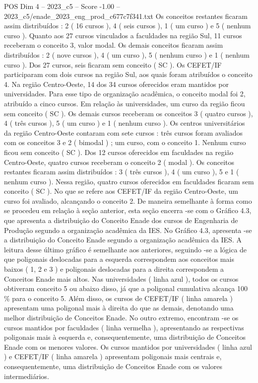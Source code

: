 \begin{textsample}{POS Dim 4 – 2023\_c5 – Score -1.00 – 2023\_c5/enade\_2023\_eng\_prod\_c677c7f341.txt}
Os conceitos restantes ficaram assim distribuídos : 2 ( 16 cursos ), 4 ( seis cursos ), 1 ( um curso ) e 5 ( nenhum curso ).
Quanto aos 27 cursos vinculados a faculdades na região Sul, 11 cursos receberam o conceito 3, valor modal.
Os demais conceitos ficaram assim distribuídos : 2 ( nove cursos ), 4 ( um curso ), 5 ( nenhum curso ) e 1 ( nenhum curso ).
Dos 27 cursos, seis ficaram sem conceito ( SC ).
Os CEFET/IF participaram com dois cursos na região Sul, aos quais foram atribuídos o conceito 4.
Na região Centro-Oeste, 14 dos 34 cursos oferecidos eram mantidos por universidades.
Para esse tipo de organização acadêmica, o conceito modal foi 2, atribuído a cinco cursos.
Em relação às universidades, um curso da região ficou sem conceito ( SC ).
Os demais cursos receberam os conceitos 3 ( quatro cursos ), 4 ( três cursos ), 5 ( um curso ) e 1 ( nenhum curso ).
Os centros universitários da região Centro-Oeste contaram com sete cursos : três cursos foram avaliados com os conceitos 3 e 2 ( bimodal ) ; um curso, com o conceito 1.
Nenhum curso ficou sem conceito ( SC ).
Dos 12 cursos oferecidos em faculdades na região Centro-Oeste, quatro cursos receberam o conceito 2 ( modal ).
Os conceitos restantes ficaram assim distribuídos : 3 ( três cursos ), 4 ( um curso ), 5 e 1 ( nenhum curso ).
Nessa região, quatro cursos oferecidos em faculdades ficaram sem conceito ( SC ).
No que se refere aos CEFET/IF da região Centro-Oeste, um curso foi avaliado, alcançando o conceito 2.
De maneira semelhante à forma como se procedeu em relação à seção anterior, esta seção encerra -se com o Gráfico 4.3, que apresenta a distribuição do Conceito Enade dos cursos de Engenharia de Produção segundo a organização acadêmica da IES.
No Gráfico 4.3, apresenta -se a distribuição do Conceito Enade segundo a organização acadêmica da IES.
A leitura desse último gráfico é semelhante aos anteriores, seguindo -se a lógica de que poligonais deslocadas para a esquerda correspondem aos conceitos mais baixos ( 1, 2 e 3 ) e poligonais deslocadas para a direita correspondem a Conceitos Enade mais altos.
Nas universidades ( linha azul ), todos os cursos obtiveram conceito 5 ou abaixo disso, já que a poligonal cumulativa alcança 100 \% para o conceito 5.
Além disso, os cursos de CEFET/IF ( linha amarela ) apresentam uma poligonal mais à direita do que as demais, denotando uma melhor distribuição de Conceitos Enade.
No outro extremo, encontram -se os cursos mantidos por faculdades ( linha vermelha ), apresentando as respectivas poligonais mais à esquerda e, consequentemente, uma distribuição de Conceitos Enade com os menores valores.
Os cursos mantidos por universidades ( linha azul ) e CEFET/IF ( linha amarela ) apresentam poligonais mais centrais e, consequentemente, uma distribuição de Conceitos Enade com os valores intermediários.

\end{textsample}
